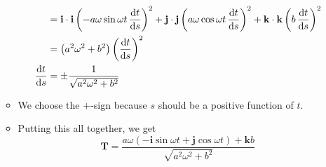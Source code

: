 \documentclass[../main.tex]{subfiles}
\begin{document}
\begin{itemize}
\begin{itemize}
\begin{align*}
            &= \textbf{i}\cdot\textbf{i}\left( -a\omega\sin\omega t\, \dv{t}{s} \right)^2+\textbf{j}\cdot\textbf{j}\left( a\omega\cos\omega t\, \dv{t}{s} \right)^2+\textbf{k}\cdot\textbf{k}\left( b\, \dv{t}{s} \right)^2\\
            &=\left( a^2\omega^2+b^2 \right)\left( \dv{t}{s} \right)^2\\
            \dv{t}{s} &= \pm\frac{1}{\sqrt{a^2\omega^2+b^2}}
        \end{align*}
        \item We choose the $+$-sign because $s$ should be a positive function of $t$.
        \item Putting this all together, we get
        \begin{equation*}
            \textbf{T} = \frac{a\omega(-\textbf{i}\sin\omega t+\textbf{j}\cos\omega t)+\textbf{k}b}{\sqrt{a^2\omega^2+b^2}}
        \end{equation*}
    \end{itemize}
\end{itemize}
\end{document}
